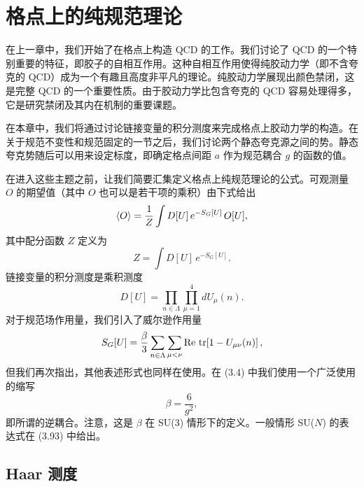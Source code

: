 
\chapter{格点上的纯规范理论}

在上一章中，我们开始了在格点上构造 QCD 的工作。我们讨论了 QCD 的一个特别重要的特征，即胶子的自相互作用。这种自相互作用使得纯胶动力学（即不含夸克的 QCD）成为一个有趣且高度非平凡的理论。纯胶动力学展现出颜色禁闭，这是完整 QCD 的一个重要性质。由于胶动力学比包含夸克的 QCD 容易处理得多，它是研究禁闭及其内在机制的重要课题。

在本章中，我们将通过讨论链接变量的积分测度来完成格点上胶动力学的构造。在关于规范不变性和规范固定的一节之后，我们讨论两个静态夸克源之间的势。静态夸克势随后可以用来设定标度，即确定格点间距 $a$ 作为规范耦合 $g$ 的函数的值。

在进入这些主题之前，让我们简要汇集定义格点上纯规范理论的公式。可观测量 $O$ 的期望值（其中 $O$ 也可以是若干项的乘积）由下式给出
\begin{equation}
  \left\langle O \right\rangle = \frac{1}{Z}\int D[U]\,e^{-S_G[U]}\,O[U],
\end{equation}
其中配分函数 $Z$ 定义为
\begin{equation}
  Z = \int D[U]\,e^{-S_G[U]}.
\end{equation}
链接变量的积分测度是乘积测度
\begin{equation}
  D[U] = \prod_{n\in\Lambda}\prod_{\mu=1}^{4} dU_\mu(n).
\end{equation}
对于规范场作用量，我们引入了威尔逊作用量
\begin{equation}
  S_G[U] = \frac{\beta}{3}\sum_{n\in\Lambda}\sum_{\mu<\nu}
           \operatorname{Re}\,\operatorname{tr}\!\left[1 - U_{\mu\nu}(n)\right],
\end{equation}
但我们再次指出，其他表述形式也同样在使用。在 (3.4) 中我们使用一个广泛使用的缩写
\begin{equation}
  \beta = \frac{6}{g^2},
\end{equation}
即所谓的逆耦合。注意，这是 $\beta$ 在 SU(3) 情形下的定义。一般情形 SU($N$) 的表达式在 (3.93) 中给出。

\section{Haar 测度}

